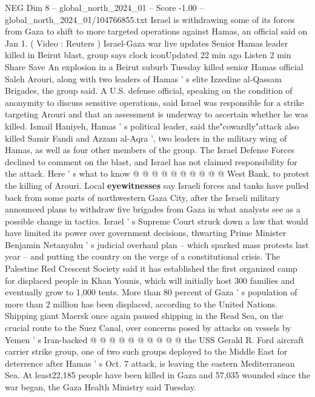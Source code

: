 \begin{textsample}{NEG Dim 8 – global\_north\_2024\_01 – Score -1.00 – global\_north\_2024\_01/104766855.txt}  \label{ex:f8_neg_271}
Israel is withdrawing some of its forces from Gaza to shift to more targeted operations against Hamas, an official said on Jan 1. ( Video : Reuters ) Israel-Gaza war live updates Senior Hamas leader killed in Beirut blast, group says clock iconUpdated 22 min ago Listen 2 min Share Save An explosion in a Beirut suburb Tuesday killed senior Hamas official Saleh Arouri, along with two leaders of Hamas ' s elite Izzedine al-Qassam Brigades, the group said.
A U.S. defense official, speaking on the condition of anonymity to discuss sensitive operations, said Israel was responsible for a strike targeting Arouri and that an assessment is underway to ascertain whether he was killed.
Ismail Haniyeh, Hamas ' s political leader, said the"cowardly"attack also killed Samir Fandi and Azzam al-Aqra ', two leaders in the military wing of Hamas, as well as four other members of the group.
The Israel Defense Forces declined to comment on the blast, and Israel has not claimed responsibility for the attack.
Here ' s what to know @ @ @ @ @ @ @ @ @ @ West Bank, to protest the killing of Arouri.
Local \textbf{eyewitnesses} say Israeli forces and tanks have pulled back from some parts of northwestern Gaza City, after the Israeli military announced plans to withdraw five brigades from Gaza in what analysts see as a possible change in tactics.
Israel ' s Supreme Court struck down a law that would have limited its power over government decisions, thwarting Prime Minister Benjamin Netanyahu ' s judicial overhaul plan -- which sparked mass protests last year -- and putting the country on the verge of a constitutional crisis.
The Palestine Red Crescent Society said it has established the first organized camp for displaced people in Khan Younis, which will initially host 300 families and eventually grow to 1,000 tents.
More than 80 percent of Gaza ' s population of more than 2 million has been displaced, according to the United Nations.
Shipping giant Maersk once again paused shipping in the Read Sea, on the crucial route to the Suez Canal, over concerns posed by attacks on vessels by Yemen ' s Iran-backed @ @ @ @ @ @ @ @ @ @ the USS Gerald R.
Ford aircraft carrier strike group, one of two such groups deployed to the Middle East for deterrence after Hamas ' s Oct. 7 attack, is leaving the eastern Mediterranean Sea.
At least22,185 people have been killed in Gaza and 57,035 wounded since the war began, the Gaza Health Ministry said Tuesday.

\end{textsample}
